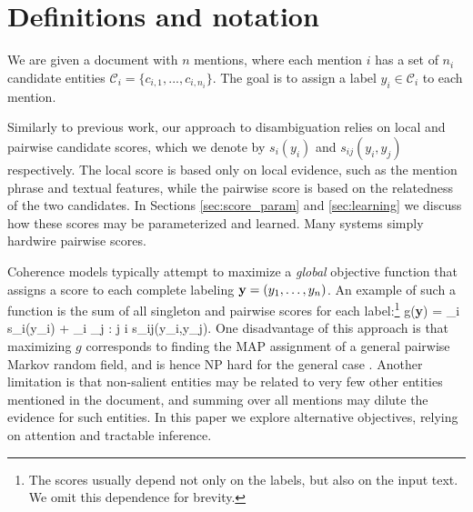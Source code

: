 \section{Definitions and notation}
\label{sec:notation}

We are given a document with $n$ mentions, where each mention $i$ has a set of $n_i$ candidate entities $\mathcal{C}_i = \{c_{i,1}, ..., c_{i,n_i}\}$. The goal is to assign a label $y_i \in \mathcal{C}_i$ to each mention.

Similarly to previous work, our approach to disambiguation relies on local and pairwise candidate scores, which we denote by $s_i(y_i)$ and $s_{ij}(y_i, y_j)$ respectively. The local score is based only on local evidence, such as the mention phrase and textual features, while the pairwise score is based on the relatedness of the two candidates. 
In Sections \ref{sec:score_param} and \ref{sec:learning} we discuss how these scores may be parameterized and learned.  Many systems \cite{Cucerzan07,Milne2008,KulkarniSRC09} simply hardwire pairwise scores.


Coherence models typically attempt to maximize a {\em global} objective function that assigns a score to each complete labeling ${\bf y} = (y_1,\ldots, y_n)$. 
An example of such a function is the sum of all singleton and pairwise scores for each label:\footnote{The scores usually depend not only on the labels, 
but also on the input text. We omit this dependence for brevity.}
\be
g({\bf y}) = \sum_i s_i(y_i) + \sum_i \sum_{j :  j \neq i} s_{ij}(y_i,y_j).
\label{eq:global_obj}
\ee 
One disadvantage of this approach is that maximizing $g$ corresponds to finding the MAP assignment of a general pairwise Markov random field, and is hence
NP hard for the general case \cite{wainwright2008graphical}. Another limitation is that non-salient entities may be related to very few other entities mentioned in the document, and summing over all mentions may dilute the evidence for such entities. In this paper we explore alternative objectives, relying on attention and tractable inference.



